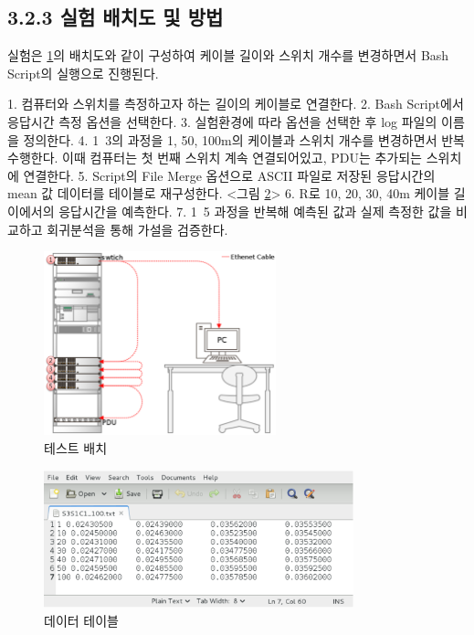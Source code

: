 \documentclass[11pt
  , a4paper
  , article
  , oneside
]{memoir}
\begin{document}
\subsection{3.2.3 실험 배치도 및 방법}

실험은 \ref{fig:switch}의 배치도와 같이 구성하여 케이블 길이와 스위치 개수를 변경하면서 Bash Script의 실행으로 진행된다. 

1. 컴퓨터와 스위치를 측정하고자 하는 길이의 케이블로 연결한다.
2. Bash Script에서 응답시간 측정 옵션을 선택한다.
3. 실험환경에 따라 옵션을 선택한 후 log 파일의 이름을 정의한다.
4. 1~3의 과정을 1, 50, 100m의 케이블과 스위치 개수를 변경하면서 반복 수행한다. 이때 컴퓨터는 첫 번째 스위치 계속 연결되어있고, PDU는 추가되는 스위치에 연결한다. 
5. Script의 File Merge 옵션으로 ASCII 파일로 저장된 응답시간의 mean 값 데이터를 테이블로 재구성한다. <그림 \ref{fig:time_table}>
6. R\citep{r}로 10, 20, 30, 40m 케이블 길이에서의 응답시간을 예측한다.
7. 1~5 과정을 반복해 예측된 값과 실제 측정한 값을 비교하고 회귀분석을 통해 가설을 검증한다.

\begin{figure}[!htb]
  \centering
  \includegraphics[width=0.6\textwidth]{./images/switch5.eps}
  \caption{테스트 배치}
  \label{fig:switch}   
\end{figure}


\begin{figure}[!htb]
  \centering
  \includegraphics[width=0.8\textwidth]{./images/timetable.eps}
  \caption{데이터 테이블}
  \label{fig:time_table}   
\end{figure}
\end{document}
